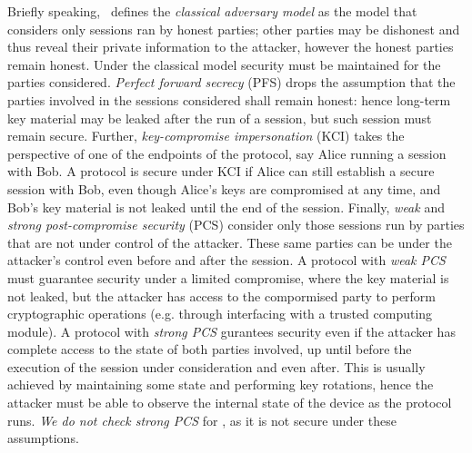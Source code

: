 Briefly speaking,~\cite{cohn2016post} defines the \emph{classical adversary
  model} as the model that considers only sessions ran by honest parties; other
parties may be dishonest and thus reveal their private information to the
attacker, however the honest parties remain honest.
%
Under the classical model security must be maintained for the parties
considered.
%
\emph{Perfect forward secrecy} (PFS) drops the assumption that the parties
involved in the sessions considered shall remain honest: hence long-term key
material may be leaked after the run of a session, but such session must remain
secure.
%
Further, \emph{key-compromise impersonation} (KCI) takes the perspective of one
of the endpoints of the protocol, say Alice running a session with Bob. A
protocol is secure under KCI if Alice can still establish a secure session with
Bob, even though Alice's keys are compromised at any time, and Bob's key
material is not leaked until the end of the session.
%
Finally, \emph{weak} and \emph{strong post-compromise security} (PCS) consider
only those sessions run by parties that are not under control of the
attacker. These same parties can be under the attacker's control even before and
after the session.
%
A protocol with \emph{weak PCS} must guarantee security under a limited
compromise, where the key material is not leaked, but the attacker has access to
the compormised party to perform cryptographic operations (e.g. through
interfacing with a trusted computing module).
%
A protocol with \emph{strong PCS} gurantees security even if the attacker has
complete access to the state of both parties involved, up until before the
execution of the session under consideration and even after.
%
This is usually achieved by maintaining some state and performing key rotations,
hence the attacker must be able to observe the internal state of the device as
the protocol runs.
%
\emph{We do not check strong PCS} for \mEdhoc, as it is not secure under these
assumptions.



